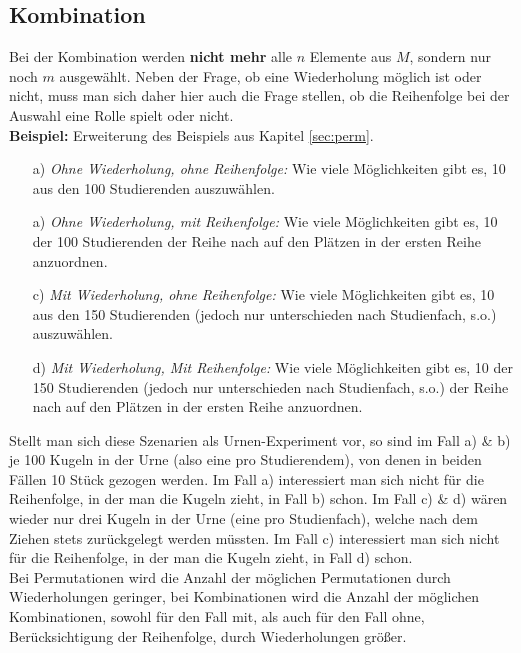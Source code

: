 \documentclass[a4paper]{article}
\newcommand\dangersign[1][2ex]{%
  \renewcommand\stacktype{L}%
  \scaleto{\stackon[1.3pt]{\color{red}$\triangle$}{\tiny !}}{#1}%
}
\begin{document}
\subsection{Kombination}
Bei der Kombination werden \textbf{nicht mehr} alle $n$ Elemente aus $M$, sondern nur noch $m$ ausgewählt. Neben der Frage, ob eine Wiederholung möglich ist oder nicht, muss man sich daher hier auch die Frage stellen, ob die Reihenfolge bei der Auswahl eine Rolle spielt oder nicht. \\
\textbf{Beispiel:} Erweiterung des Beispiels aus Kapitel \ref{sec:perm}.
\begin{itemize}
    \item[a)] \textit{Ohne Wiederholung, ohne Reihenfolge:} Wie viele Möglichkeiten gibt es, 10 aus den 100 Studierenden auszuwählen.
    \item[a)] \textit{Ohne Wiederholung, mit Reihenfolge:} Wie viele Möglichkeiten gibt es, 10 der 100 Studierenden der Reihe nach auf den Plätzen in der ersten Reihe anzuordnen.
    \item[c)] \textit{Mit Wiederholung, ohne Reihenfolge:} Wie viele Möglichkeiten gibt es, 10 aus den 150 Studierenden (jedoch nur unterschieden nach Studienfach, s.o.) auszuwählen.
    \item[d)] \textit{Mit Wiederholung, Mit Reihenfolge:} Wie viele Möglichkeiten gibt es, 10 der 150 Studierenden (jedoch nur unterschieden nach Studienfach, s.o.) der Reihe nach auf den Plätzen in der ersten Reihe anzuordnen.
\end{itemize}
Stellt man sich diese Szenarien als Urnen-Experiment vor, so sind im Fall a) \& b) je 100 Kugeln in der Urne (also eine pro Studierendem), von denen in beiden Fällen 10 Stück gezogen werden. Im Fall a) interessiert man sich nicht für die Reihenfolge, in der man die Kugeln zieht, in Fall b) schon. Im Fall c) \& d) wären wieder nur drei Kugeln in der Urne (eine pro Studienfach), welche nach dem Ziehen stets zurückgelegt werden müssten. Im Fall c) interessiert man sich nicht für die Reihenfolge, in der man die Kugeln zieht, in Fall d) schon.\\

\noindent \dangersign[3ex] Bei Permutationen wird die Anzahl der möglichen Permutationen durch Wiederholungen geringer, bei Kombinationen wird die Anzahl der möglichen Kombinationen, sowohl für den Fall mit, als auch für den Fall ohne, Berücksichtigung der Reihenfolge, durch Wiederholungen größer.

\clearpage
\end{document}

